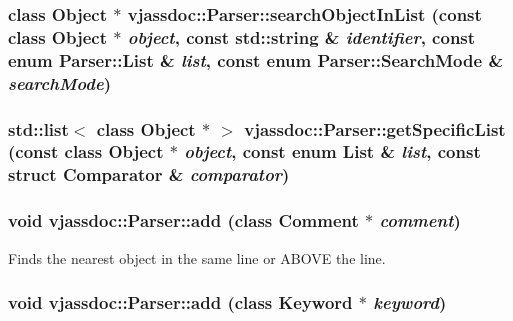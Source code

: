 \hypertarget{classvjassdoc_1_1Parser_2929834a3d98897abd02af423eb49667}{
\subsubsection{\setlength{\rightskip}{0pt plus 5cm}class {\bf Object} $\ast$ vjassdoc::Parser::searchObjectInList (const class {\bf Object} $\ast$ {\em object}, const std::string \& {\em identifier}, const enum {\bf Parser::List} \& {\em list}, const enum {\bf Parser::SearchMode} \& {\em searchMode})}}
\label{classvjassdoc_1_1Parser_2929834a3d98897abd02af423eb49667}


\hypertarget{classvjassdoc_1_1Parser_930bbcf436121ba4f972d68dcceb96ae}{
\subsubsection{\setlength{\rightskip}{0pt plus 5cm}std::list$<$ class {\bf Object} $\ast$ $>$ vjassdoc::Parser::getSpecificList (const class {\bf Object} $\ast$ {\em object}, const enum {\bf List} \& {\em list}, const struct {\bf Comparator} \& {\em comparator})}}
\label{classvjassdoc_1_1Parser_930bbcf436121ba4f972d68dcceb96ae}


\hypertarget{classvjassdoc_1_1Parser_9c5f7cb3c5f1203cd16f85eeeb9356d4}{
\subsubsection{\setlength{\rightskip}{0pt plus 5cm}void vjassdoc::Parser::add (class {\bf Comment} $\ast$ {\em comment})}}
\label{classvjassdoc_1_1Parser_9c5f7cb3c5f1203cd16f85eeeb9356d4}


Finds the nearest object in the same line or ABOVE the line. 

\hypertarget{classvjassdoc_1_1Parser_ca0eb0b534b582339722c7eb9a8fb8fc}{
\subsubsection{\setlength{\rightskip}{0pt plus 5cm}void vjassdoc::Parser::add (class {\bf Keyword} $\ast$ {\em keyword})}}
\label{classvjassdoc_1_1Parser_ca0eb0b534b582339722c7eb9a8fb8fc}


